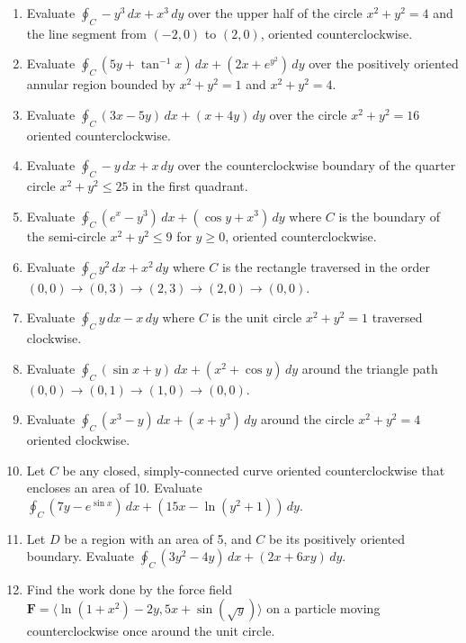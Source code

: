 \documentclass[11pt]{article}
\begin{document}
\begin{enumerate}[label=\textbf{Q\arabic*.}, leftmargin=*]
    \item Evaluate $\oint_C -y^3 \,dx + x^3 \,dy$ over the upper half of the circle $x^2 + y^2 = 4$ and the line segment from $(-2,0)$ to $(2,0)$, oriented counterclockwise.
    \item Evaluate $\oint_C (5y + \tan^{-1}x) \,dx + (2x + e^{y^2}) \,dy$ over the positively oriented annular region bounded by $x^2 + y^2 = 1$ and $x^2 + y^2 = 4$.
    \item Evaluate $\oint_C (3x - 5y) \,dx + (x + 4y) \,dy$ over the circle $x^2 + y^2 = 16$ oriented counterclockwise.
    \item Evaluate $\oint_C -y \,dx + x \,dy$ over the counterclockwise boundary of the quarter circle $x^2 + y^2 \le 25$ in the first quadrant.
    \item Evaluate $\oint_C (e^x - y^3) \,dx + (\cos y + x^3) \,dy$ where $C$ is the boundary of the semi-circle $x^2 + y^2 \le 9$ for $y \ge 0$, oriented counterclockwise.
    
    \item Evaluate $\oint_C y^2 \,dx + x^2 \,dy$ where $C$ is the rectangle traversed in the order $(0,0) \to (0,3) \to (2,3) \to (2,0) \to (0,0)$.
    \item Evaluate $\oint_C y \,dx - x \,dy$ where $C$ is the unit circle $x^2 + y^2 = 1$ traversed clockwise.
    \item Evaluate $\oint_C (\sin x + y) \,dx + (x^2 + \cos y) \,dy$ around the triangle path $(0,0) \to (0,1) \to (1,0) \to (0,0)$.
    \item Evaluate $\oint_C (x^3 - y) \,dx + (x + y^3) \,dy$ around the circle $x^2 + y^2 = 4$ oriented clockwise.
    
    \item Let $C$ be any closed, simply-connected curve oriented counterclockwise that encloses an area of 10. Evaluate $\oint_C (7y - e^{\sin x}) \,dx + (15x - \ln(y^2+1)) \,dy$.
    \item Let $D$ be a region with an area of 5, and $C$ be its positively oriented boundary. Evaluate $\oint_C (3y^2 - 4y) \,dx + (2x + 6xy) \,dy$.
    \item Find the work done by the force field $\mathbf{F} = \langle \ln(1+x^2) - 2y, 5x + \sin(\sqrt{y}) \rangle$ on a particle moving counterclockwise once around the unit circle.
    

\end{enumerate}
\end{document}
